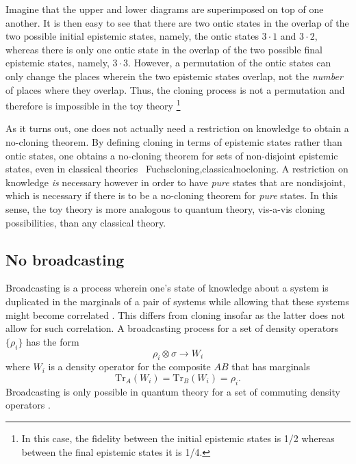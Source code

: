 \documentclass[pra,twocolumn,nofootinbib,showpacs]{revtex4}
\begin{document}
Imagine that the upper and lower diagrams are superimposed on top of one
another. It is then easy to see that there are two ontic states in the
overlap of the two possible initial epistemic states, namely, the ontic
states $3\cdot 1$ and $3\cdot 2$, whereas there is only one ontic state in
the overlap of the two possible final epistemic states, namely, $3\cdot 3$.
However, a permutation of the ontic states can only change the places
wherein the two epistemic states overlap, not the \emph{number} of places
where they overlap. Thus, the cloning process is not a permutation and
therefore is impossible in the toy theory \footnote{%
In this case, the fidelity between the initial epistemic states is 1/2
whereas between the final epistemic states it is 1/4.}

As it turns out, one does not actually need a restriction on knowledge to
obtain a no-cloning theorem. By defining cloning in terms of epistemic
states rather than ontic states, one obtains a no-cloning theorem for sets
of non-disjoint epistemic states, even in classical theories~{%
Fuchscloning,classicalnocloning}. A restriction on knowledge \emph{is }%
necessary however in order to have \emph{pure} states that are nondisjoint,
which is necessary if there is to be a no-cloning theorem for \emph{pure}
states. In this sense, the toy theory is more analogous to quantum theory,
vis-a-vis cloning possibilities, than any classical theory.

\subsection{No broadcasting}

\label{nobroadcasting}

Broadcasting is a process wherein one's state of knowledge about a system is
duplicated in the marginals of a pair of systems while allowing that these
systems might become correlated \cite{broadcasting}. This differs from
cloning insofar as the latter does not allow for such correlation. A
broadcasting process for a set of density operators $\{\rho _{i}\}$ has the
form
\begin{equation}
\rho _{i}\otimes \sigma \rightarrow W_{i}  \label{defnbroadcasting}
\end{equation}
where $W_{i}$ is a density operator for the composite $AB$ that has
marginals
\begin{equation}
\text{Tr}_{A}(W_{i})=\text{Tr}_{B}(W_{i})=\rho _{i}.
\label{constraintonmarginals}
\end{equation}
Broadcasting is only possible in quantum theory for a set of commuting
density operators \cite{broadcasting}.
\end{document}
